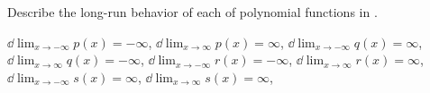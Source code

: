 \begin{exercises}
\begin{problem}
Describe the long-run behavior of each of polynomial functions in 
.
    \begin{shortsolution}
        $\dd\lim_{x\rightarrow-\infty}p(x)=-\infty$,
        $\dd\lim_{x\rightarrow\infty}p(x)=\infty$,
        $\dd\lim_{x\rightarrow-\infty}q(x)=\infty$,
        $\dd\lim_{x\rightarrow\infty}q(x)=-\infty$,
        $\dd\lim_{x\rightarrow-\infty}r(x)=-\infty$,
        $\dd\lim_{x\rightarrow\infty}r(x)=\infty$,
        $\dd\lim_{x\rightarrow-\infty}s(x)=\infty$,
        $\dd\lim_{x\rightarrow\infty}s(x)=\infty$,
    \end{shortsolution}
\end{problem}


\end{exercises}
